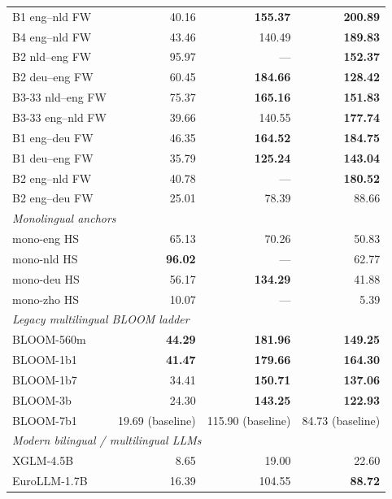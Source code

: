 \begin{table}[!ht]
\begin{tabular}{lrrr}
    B1 eng--nld FW        & 40.16 & \textbf{155.37} & \textbf{200.89} \\
    B4 eng--nld FW        & 43.46 & 140.49 & \textbf{189.83} \\
    B2 nld--eng FW        & 95.97 & --- & \textbf{152.37} \\
    B2 deu--eng FW        & 60.45 & \textbf{184.66} & \textbf{128.42} \\
    B3-33 nld--eng FW     & 75.37 & \textbf{165.16} & \textbf{151.83} \\
    B3-33 eng--nld FW     & 39.66 & 140.55 & \textbf{177.74} \\
    B1 eng--deu FW        & 46.35 & \textbf{164.52} & \textbf{184.75} \\
    B1 deu--eng FW        & 35.79 & \textbf{125.24} & \textbf{143.04} \\
    B2 eng--nld FW        & 40.78 & --- & \textbf{180.52} \\
    B2 eng--deu FW        & 25.01 & 78.39 & 88.66 \\
    \midrule
    \multicolumn{4}{l}{\textit{Monolingual \beetle{} anchors}} \\
    \midrule
    mono-eng HS           & 65.13 & 70.26 & 50.83 \\
    mono-nld HS           & \textbf{96.02} & --- & 62.77 \\
    mono-deu HS           & 56.17 & \textbf{134.29} & 41.88 \\
    mono-zho HS           & 10.07 & --- & 5.39 \\
    \midrule
    \multicolumn{4}{l}{\textit{Legacy multilingual BLOOM ladder}} \\
    \midrule
    BLOOM-560m            & \textbf{44.29} & \textbf{181.96} & \textbf{149.25} \\
    BLOOM-1b1             & \textbf{41.47} & \textbf{179.66} & \textbf{164.30} \\
    BLOOM-1b7             & 34.41 & \textbf{150.71} & \textbf{137.06} \\
    BLOOM-3b              & 24.30 & \textbf{143.25} & \textbf{122.93} \\
    BLOOM-7b1             & 19.69 (baseline) & 115.90 (baseline) & 84.73 (baseline) \\
    \midrule
    \multicolumn{4}{l}{\textit{Modern bilingual / multilingual LLMs}} \\
    \midrule
    XGLM-4.5B             & 8.65 & 19.00 & 22.60 \\
    EuroLLM-1.7B          & 16.39 & 104.55 & \textbf{88.72} \\

\end{tabular}
\end{table}
